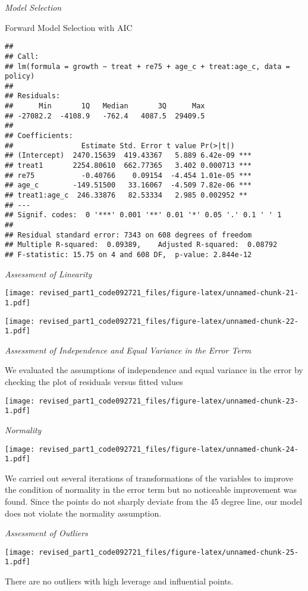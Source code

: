 \documentclass[
]{article}
\begin{document}
\emph{Model Selection}

Forward Model Selection with AIC

\begin{verbatim}
## 
## Call:
## lm(formula = growth ~ treat + re75 + age_c + treat:age_c, data = policy)
## 
## Residuals:
##      Min       1Q   Median       3Q      Max 
## -27082.2  -4108.9   -762.4   4087.5  29409.5 
## 
## Coefficients:
##                Estimate Std. Error t value Pr(>|t|)    
## (Intercept)  2470.15639  419.43367   5.889 6.42e-09 ***
## treat1       2254.80610  662.77365   3.402 0.000713 ***
## re75           -0.40766    0.09154  -4.454 1.01e-05 ***
## age_c        -149.51500   33.16067  -4.509 7.82e-06 ***
## treat1:age_c  246.33876   82.53334   2.985 0.002952 ** 
## ---
## Signif. codes:  0 '***' 0.001 '**' 0.01 '*' 0.05 '.' 0.1 ' ' 1
## 
## Residual standard error: 7343 on 608 degrees of freedom
## Multiple R-squared:  0.09389,    Adjusted R-squared:  0.08792 
## F-statistic: 15.75 on 4 and 608 DF,  p-value: 2.844e-12
\end{verbatim}

\emph{Assessment of Linearity}

\texttt{[image: revised\_part1\_code092721\_files/figure-latex/unnamed-chunk-21-1.pdf]}

\texttt{[image: revised\_part1\_code092721\_files/figure-latex/unnamed-chunk-22-1.pdf]}

\emph{Assessment of Independence and Equal Variance in the Error Term}

We evaluated the assumptions of independence and equal variance in the
error by checking the plot of residuals versus fitted values

\texttt{[image: revised\_part1\_code092721\_files/figure-latex/unnamed-chunk-23-1.pdf]}

\emph{Normality}

\texttt{[image: revised\_part1\_code092721\_files/figure-latex/unnamed-chunk-24-1.pdf]}

We carried out several iterations of transformations of the variables to
improve the condition of normality in the error term but no noticeable
improvement was found. Since the points do not sharply deviate from the
45 degree line, our model does not violate the normality assumption.

\emph{Assessment of Outliers}

\texttt{[image: revised\_part1\_code092721\_files/figure-latex/unnamed-chunk-25-1.pdf]}

There are no outliers with high leverage and influential points.
\end{document}
